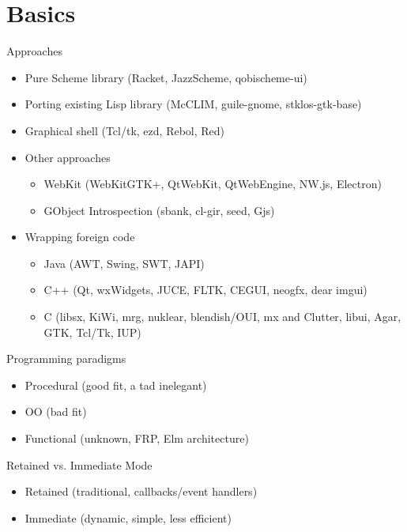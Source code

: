 \documentclass[presentation]{beamer}
\begin{document}
\section{Basics}
\label{sec-2}

\begin{frame}[label=sec-2-1]{Approaches}
\begin{itemize}
\item Pure Scheme library (Racket, JazzScheme, qobischeme-ui)
\item Porting existing Lisp library (McCLIM, guile-gnome, stklos-gtk-base)
\item Graphical shell (Tcl/tk, ezd, Rebol, Red)
\item Other approaches
\begin{itemize}
\item WebKit (WebKitGTK+, QtWebKit, QtWebEngine, NW.js, Electron)
\item GObject Introspection (sbank, cl-gir, seed, Gjs)
\end{itemize}
\item Wrapping foreign code
\begin{itemize}
\item Java (AWT, Swing, SWT, JAPI)
\item C++ (Qt, wxWidgets, JUCE, FLTK, CEGUI, neogfx, dear imgui)
\item C (libsx, KiWi, mrg, nuklear, blendish/OUI, mx and Clutter, libui,
Agar, GTK, Tcl/Tk, IUP)
\end{itemize}
\end{itemize}
\end{frame}

\begin{frame}[label=sec-2-2]{Programming paradigms}
\begin{itemize}
\item Procedural (good fit, a tad inelegant)
\item OO (bad fit)
\item Functional (unknown, FRP, Elm architecture)
\end{itemize}
\end{frame}

\begin{frame}[label=sec-2-3]{Retained vs. Immediate Mode}
\begin{itemize}
\item Retained (traditional, callbacks/event handlers)
\item Immediate (dynamic, simple, less efficient)
\end{itemize}
\end{frame}
\end{document}
